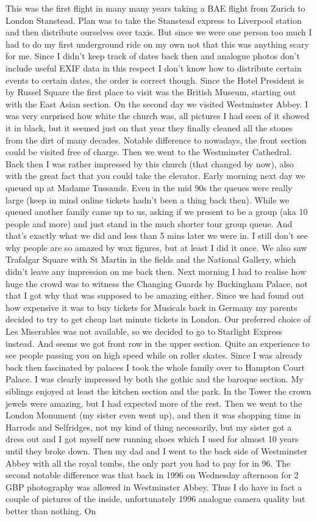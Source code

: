 This was the first flight in many many years taking a BAE flight from Zurich to London Stanstead. Plan was to take the Stanstead express to Liverpool station and then distribute ourselves over taxis. But since we were one person too much I had to do my first underground ride on my own not that this was anything scary for me. Since I didn't keep track of dates back then and analogue photos don't include useful EXIF data in this respect I don't know how to distribute certain events to certain dates, the order is correct though. Since the Hotel President is by Russel Square the first place to visit was the British Museum, starting out with the East Asian section. On the second day we visited Westminster Abbey. I was very surprised how white the church was, all pictures I had seen of it showed it in black, but it seemed just on that year they finally cleaned all the stones from the dirt of many decades. Notable difference to nowadays, the front section could be visited free of charge. Then we went to the Westminster Cathedral. Back then I was rather impressed by this church (that changed by now), also with the great fact that you could take the elevator. Early morning next day we queued up at Madame Tussauds. Even in the mid 90s the queues were really large (keep in mind online tickets hadn't been a thing back then). While we queued another family came up to us, asking if we present to be a group (aka 10 people and more) and just stand in the much shorter tour group queue. And that's exactly what we did and less than 5 mins later we were in. I still don't see why people are so amazed by wax figures, but at least I did it once. We also saw Trafalgar Square with St Martin in the fields and the National Gallery, which didn't leave any impression on me back then. Next morning I had to realise how huge the crowd was to witness the Changing Guards by Buckingham Palace, not that I got why that was supposed to be amazing either. Since we had found out how expensive it was to buy tickets for Musicals back in Germany my parents decided to try to get cheap last minute tickets in London. Our preferred choice of Les Miserables was not available, so we decided to go to Starlight Express instead. And seems we got front row in the upper section. Quite an experience to see people passing you on high speed while on roller skates. Since I was already back then fascinated by palaces I took the whole family over to Hampton Court Palace. I was clearly impressed by both the gothic and the baroque section. My siblings enjoyed at least the kitchen section and the park. In the Tower the crown jewels were amazing, but I had expected more of the rest. Then we went to the London Monument (my sister even went up), and then it was shopping time in Harrods and Selfridges, not my kind of thing necessarily, but my sister got a dress out and I got myself new running shoes which I used for almost 10 years until they broke down. Then my dad and I went to the back side of Westminster Abbey with all the royal tombs, the only part you had to pay for in 96. The second notable difference was that back in 1996 on Wednesday afternoon for 2 GBP photography was allowed in Westminster Abbey. Thus I do have in fact a couple of pictures of the inside, unfortunately 1996 analogue camera quality but better than nothing. On 